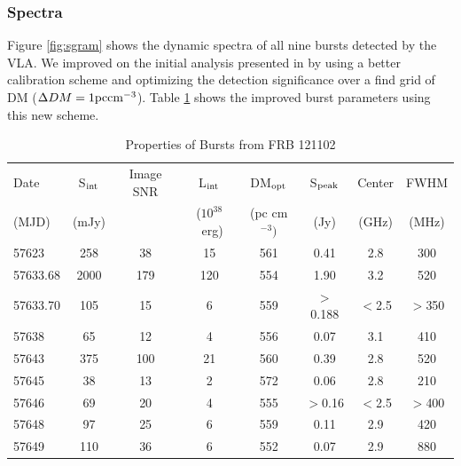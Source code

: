 \documentclass[twocolumn]{aastex61}
\newcommand{\frb}{FRB 121102}
\begin{document}
\subsubsection{Spectra}
\label{sec:spec}
Figure \ref{fig:sgram} shows the dynamic spectra of all nine bursts detected by the VLA. We improved on the initial analysis presented in \citet{LOC} by using a better calibration scheme and optimizing the detection significance over a find grid of DM ($\Delta DM=1 \rm{pc} \rm{cm}^{-3}$). Table \ref{tab:spec} shows the improved burst parameters using this new scheme. 

\begin{table}
\caption{Properties of Bursts from \frb}
\centering
\begin{tabular}{lccccccc}
\hline
Date                & S$_{\rm{int}}$  & Image SNR & L$_{\rm{int}}$ & DM$_{\rm{opt}}$ & S$_{\rm{peak}}$  & Center & FWHM \\
(MJD)               & (mJy)           &           & ($10^{38}$\ erg) & (pc cm$^{-3})$ & (Jy) & (GHz)  & (MHz) \\ \hline
57623               & 258             & 38        & 15   & 561 & 0.41                                    & 2.8 & 300 \\
57633.68            & 2000            & 179       & 120  & 554 & 1.90                                    & 3.2 & 520 \\
57633.70\tablenotemark{a} & 105       & 15        & 6    & 559 & $>$0.188                                & $<$2.5 & $>$350 \\
57638               & 65              & 12        & 4    & 556 & 0.07                                    & 3.1 & 410 \\
57643               & 375             & 100       & 21   & 560 & 0.39                                    & 2.8 & 520 \\
57645               & 38              & 13        & 2    & 572 & 0.06                                    & 2.8 & 210 \\
57646\tablenotemark{a} & 69           & 20        & 4    & 555 & $>$0.16                                 & $<$2.5 & $>$400 \\
57648\tablenotemark{b} & 97           & 25        & 6    & 559 & 0.11                                    & 2.9 & 420 \\
57649               & 110             & 36        & 6    & 552 & 0.07                                    & 2.9 & 880 \\ \hline
\end{tabular}
\label{tab:spec}
\end{table} 
\end{document}

